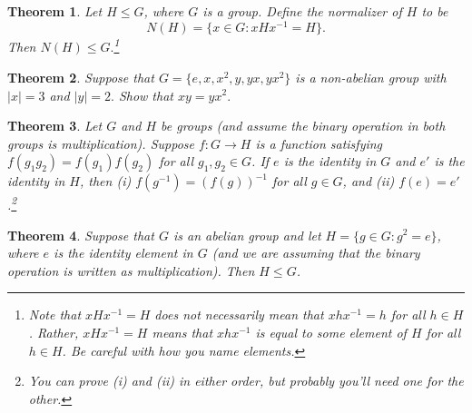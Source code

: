 \documentclass[11pt]{article}
\newtheorem{theorem}{Theorem}
\theoremstyle{definition}
\begin{document}
\bigskip

\begin{theorem}
Let $H\leq G$, where $G$ is a group.  Define the \emph{normalizer} of $H$ to be
\[ 
N(H)=\{x\in G : xHx^{-1}=H\}.
\]
Then $N(H)\leq G.$\footnote{Note that  $xHx^{-1}=H$ does not necessarily mean that $xhx^{-1}=h$ for all $h\in H$.  Rather, $ xHx^{-1}=H$ means that $xhx^{-1}$ is equal to some element of $H$ for all $h\in H$.  Be careful with how you name elements.}
\end{theorem}

\newpage

\begin{theorem}
Suppose that $G=\{e, x, x^2, y, yx, yx^2 \}$ is a non-abelian group with $|x|=3$ and $|y|=2.$  Show that $xy=yx^2.$
\end{theorem}

\newpage

\begin{theorem}
Let $G$ and $H$ be groups (and assume the binary operation in both groups is multiplication).  Suppose $f: G\to H$ is a function satisfying $f(g_{1}g_{2})=f(g_{1})f(g_{2})$ for all $g_{1},g_{2}\in G$.  If $e$ is the identity in $G$ and $e'$ is the identity in $H$, then (i) $f(g^{-1})=(f(g))^{-1}$ for all $g\in G$, and (ii) $f(e)=e'$.\footnote{You can prove (i) and (ii) in either order, but probably you'll need one for the other.}

\end{theorem}

\newpage

\begin{theorem}
Suppose that $G$ is an abelian group and let $H=\{g\in G: g^2=e\}$, where $e$ is the identity element in $G$ (and we are assuming that the binary operation is written as multiplication).  Then $H\leq G$.
\end{theorem}
\end{document}
